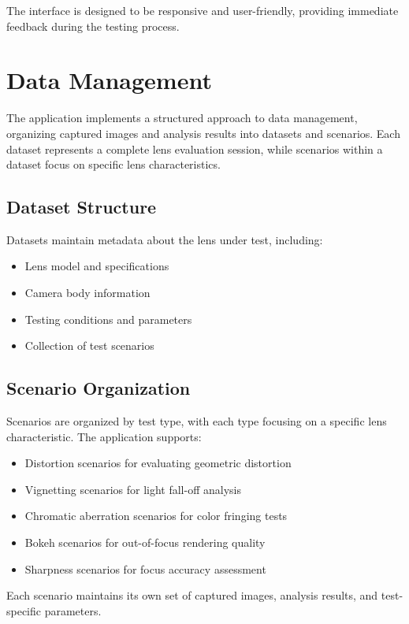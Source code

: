 The interface is designed to be responsive and user-friendly, providing immediate feedback during the testing process.

\section{Data Management}

The application implements a structured approach to data management, organizing captured images and analysis results into datasets and scenarios. Each dataset represents a complete lens evaluation session, while scenarios within a dataset focus on specific lens characteristics.

\subsection{Dataset Structure}

Datasets maintain metadata about the lens under test, including:

\begin{itemize}
    \item Lens model and specifications
    \item Camera body information
    \item Testing conditions and parameters
    \item Collection of test scenarios
\end{itemize}

\subsection{Scenario Organization}

Scenarios are organized by test type, with each type focusing on a specific lens characteristic. The application supports:

\begin{itemize}
    \item Distortion scenarios for evaluating geometric distortion
    \item Vignetting scenarios for light fall-off analysis
    \item Chromatic aberration scenarios for color fringing tests
    \item Bokeh scenarios for out-of-focus rendering quality
    \item Sharpness scenarios for focus accuracy assessment
\end{itemize}

Each scenario maintains its own set of captured images, analysis results, and test-specific parameters.


